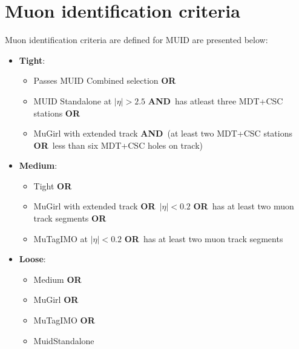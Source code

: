 \newcommand{\OR}{\textbf{OR}}
\newcommand{\AND}{\textbf{AND}}
\chapter{Muon identification criteria} \label{app:DetectorMuonID}

Muon identification criteria are defined for MUID are presented below:

\begin{itemize}
  \item \textbf{Tight}:
  \begin{itemize}
    \item Passes MUID Combined selection \OR
    \item MUID Standalone at $|\eta|>2.5$ \AND\ has atleast three MDT+CSC stations \OR
    \item MuGirl with extended track \AND\ (at least two MDT+CSC stations \OR\ less than six MDT+CSC holes on track)
  \end{itemize}
  \item \textbf{Medium}:
  \begin{itemize}
    \item Tight \OR
    \item MuGirl with extended track \OR\ $|\eta|<0.2$ \OR\ has at least two muon track segments \OR
    \item MuTagIMO at $|\eta|<0.2$ \OR\ has at least two muon track segments
  \end{itemize} 
  \item \textbf{Loose}:
  \begin{itemize}
    \item Medium \OR
    \item MuGirl \OR
    \item MuTagIMO \OR
    \item MuidStandalone
  \end{itemize}
\end{itemize}


